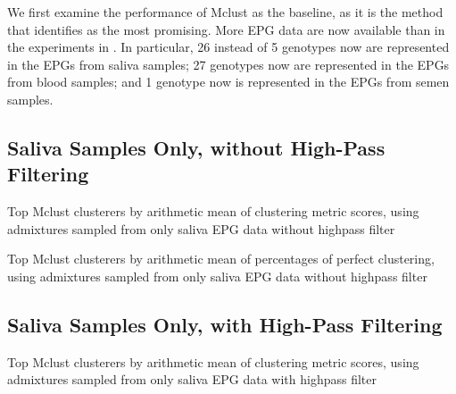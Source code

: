 We first examine the performance of Mclust as the baseline, as it is the method that \cite{odonnell_clustering_2021} identifies as the most promising. More EPG data are now available than in the experiments in \cite{odonnell_clustering_2021}. In particular, 26 instead of 5 genotypes now are represented in the EPGs from saliva samples; 27 genotypes now are represented in the EPGs from blood samples; and 1 genotype now is represented in the EPGs from semen samples.

\subsection{Saliva Samples Only, without High-Pass Filtering}

\begin{table}[H]
\centering
{}
\caption{Top Mclust clusterers by arithmetic mean of clustering metric scores, using admixtures sampled from only saliva EPG data without highpass filter}
\label{table:top_mclust_clusterers_by_metrics_highpass_0-sampleids_saliva-nruns_1000}
\end{table}

\begin{table}[H]
\centering
{}
\caption{Top Mclust clusterers by arithmetic mean of percentages of perfect clustering, using admixtures sampled from only saliva EPG data without highpass filter}
\label{table:top_mclust_clusterers_by_binomial_confidence_highpass_0-sampleids_saliva-nruns_1000}
\end{table}

\subsection{Saliva Samples Only, with High-Pass Filtering}

\begin{table}[H]
\centering
{}
\caption{Top Mclust clusterers by arithmetic mean of clustering metric scores, using admixtures sampled from only saliva EPG data with highpass filter}
\label{table:top_mclust_clusterers_by_metrics_highpass_71-sampleids_saliva-nruns_1000}
\end{table}

